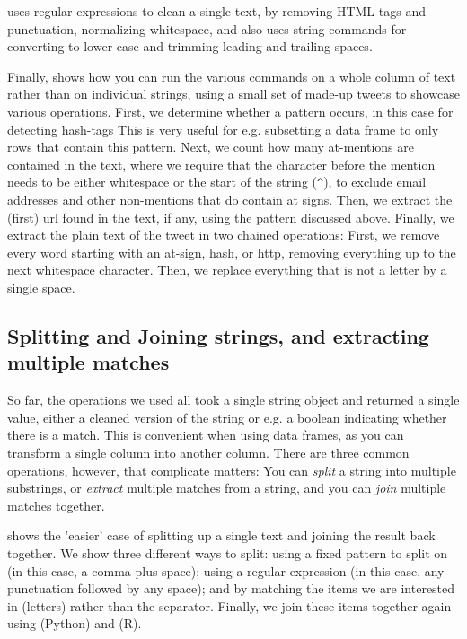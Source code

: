  uses regular expressions to clean a single text, by removing HTML tags and punctuation,
normalizing whitespace, and also uses string commands for converting to lower case and trimming leading and trailing spaces.


Finally,  shows how you can run the various commands on a whole column of text rather than on individual strings,
using  a small set of made-up tweets to showcase various operations.
First, we determine whether a pattern occurs, in this case for detecting hash-tags
This is very useful for e.g. subsetting a data frame to only rows that contain this pattern.
Next, we count how many at-mentions are contained in the text, where we require that the character before the mention needs to be either whitespace or the start of the string (\verb|^|), to exclude email addresses and other non-mentions that do contain at signs.
Then, we extract the (first) url found in the text, if any, using the pattern discussed above.
Finally, we extract the plain text of the tweet in two chained operations:
First, we remove every word starting with an at-sign, hash, or http, removing everything up to the next whitespace character.
Then, we replace everything that is not a letter by a single space. 



\subsection{Splitting and Joining strings, and extracting multiple matches}

So far, the operations we used all took a single string object and returned a single value,
either a cleaned version of the string or e.g. a boolean indicating whether there is a match.
This is convenient when using data frames, as you can transform a single column into another column.
There are three common operations, however, that complicate matters:
You can \emph{split} a string into multiple substrings, or \emph{extract} multiple matches from a string,
and you can \emph{join} multiple matches together.


 shows the 'easier' case of splitting up a single text and joining the result back together.
We show three different ways to split: using a fixed pattern to split on (in this case, a comma plus space);
using a regular expression (in this case, any punctuation followed by any space);
and by matching the items we are interested in (letters) rather than the separator.
Finally, we join these items together again using  (Python) and  (R).

